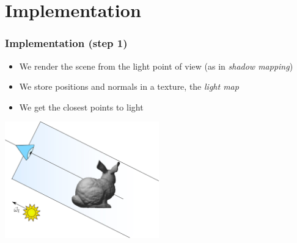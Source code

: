 \documentclass{beamer}
\begin{document}
\section{Implementation}
\begin{frame}
    \frametitle{Implementation (step 1)}
			\begin{itemize}
			\item We render the scene from the light point of view (as in \emph{shadow mapping})
			\item We store positions and normals in a texture, the \emph{light map}
			\item We get the closest points to light
			\end{itemize}
			\centering
			\includegraphics[width=0.5\textwidth]{step1.jpg} 
\end{frame}
\end{document}
